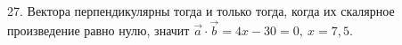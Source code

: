 27. Вектора перпендикулярны тогда и только тогда, когда их скалярное произведение равно нулю, значит $\vec{a}\cdot\vec{b}=4x-30=0,\ x=7,5.$\\
